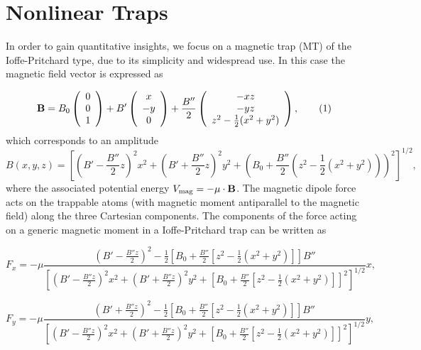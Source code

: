 \documentclass[pra,letterpaper,onecolumn,superscriptaddress,floatfix]{revtex4}
\begin{document}
\section{Nonlinear Traps}

In order to gain quantitative insights, we focus on a magnetic trap (MT) of the Ioffe-Pritchard type, due to 
its simplicity and widespread use. In this case the magnetic field vector is expressed as~\cite{Bergeman,Ketterle}

\begin{equation}
{\bf B}=B_0 \left(\begin{array} {c}  0  \\  0  \\ 1 \end{array}\right)
+          B'  \left(\begin{array} {c}  x  \\ -y  \\ 0 \end{array}\right)
+\frac{B''}{2} \left(\begin{array} {c} -xz \\ -yz \\ z^2-\frac{1}{2}(x^2+y^2) \end{array}\right),
\tag{1}
\label{MagField}
\end{equation}
which corresponds to an amplitude
\begin{equation}
B(x,y,z)=\left[
\left(B'-\frac{B''}{2}z\right)^2x^2+\left(B'+\frac{B''}{2}z\right)^2y^2+
\left(B_0+\frac{B''}{2}(z^2-\frac{1}{2}(x^2+y^2))\right)^2
\right]^{1/2},
\tag{2}
\end{equation}
where the associated potential energy $V_{\rm mag}=- {\mathbf \mu} \cdot {\bf B}$. 
The magnetic dipole force acts on the trappable atoms (with magnetic moment antiparallel to the magnetic field) 
along the three Cartesian components. The components of the force acting on a generic magnetic moment in a 
Ioffe-Pritchard trap can be written as 

\begin{equation}
F_x=-\mu \frac{\left(B'-\frac{B''z}{2}\right)^2-{\frac{1}{2}}\left[B_0+\frac{B''}{2}
[z^2-\frac{1}{2}(x^2+y^2)]\right]B''}
{\left[\left(B'-\frac{B''z}{2}\right)^2x^2+\left(B'+\frac{B''z}{2}\right)^2y^2+
\left[B_0+\frac{B''}{2}[z^2-\frac{1}{2}(x^2+y^2)]\right]^2\right]^{1/2}}x,
\tag{3a}
\label{3a}
\end{equation}

\begin{equation}
F_y=-\mu \frac{\left(B'+\frac{B''z}{2}\right)^2-{\frac{1}{2}}\left[B_0+\frac{B''}{2}
[z^2-\frac{1}{2}(x^2+y^2)]\right]B''}
{\left[\left(B'-\frac{B''z}{2}\right)^2x^2+\left(B'+\frac{B''z}{2}\right)^2y^2+
\left[B_0+\frac{B''}{2}[z^2-\frac{1}{2}(x^2+y^2)]\right]^2\right]^{1/2}}y,
\tag{3b}
\label{3b}
\end{equation}
\end{document}
